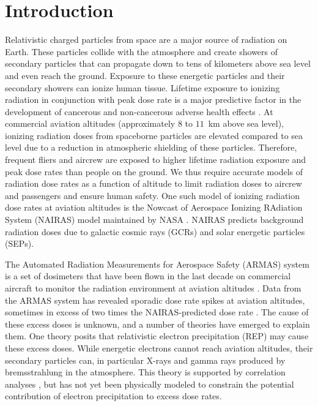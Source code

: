 \documentclass[draft]{agujournal2019}
\begin{document}
\section{Introduction}
Relativistic charged particles from space are a major source of radiation on Earth. These particles collide with the atmosphere and create showers of secondary particles that can propagate down to tens of kilometers above sea level and even reach the ground. Exposure to these energetic particles and their secondary showers can ionize human tissue. Lifetime exposure to ionizing radiation in conjunction with peak dose rate is a major predictive factor in the development of cancerous and non-cancerous adverse health effects \cite{lowe2022, shah2014}. At commercial aviation altitudes (approximately $8$ to $11$~km above sea level), ionizing radiation doses from spaceborne particles are elevated compared to sea level due to a reduction in atmospheric shielding of these particles. Therefore, frequent fliers and aircrew are exposed to higher lifetime radiation exposure and peak dose rates than people on the ground. We thus require accurate models of radiation dose rates as a function of altitude to limit radiation doses to aircrew and passengers and ensure human safety. One such model of ionizing radiation dose rates at aviation altitudes is the Nowcast of Aerospace Ionizing RAdiation System (NAIRAS) model maintained by NASA \cite{mertens2013}. NAIRAS predicts background radiation doses due to galactic cosmic rays (GCRs) and solar energetic particles (SEPs).

The Automated Radiation Measurements for Aerospace Safety (ARMAS) system is a set of dosimeters that have been flown in the last decade on commercial aircraft to monitor the radiation environment at aviation altitudes \cite{tobiska2016}. Data from the ARMAS system has revealed sporadic dose rate spikes at aviation altitudes, sometimes in excess of two times the NAIRAS-predicted dose rate \cite{tobiska2016, tobiska2018}. The cause of these excess doses is unknown, and a number of theories have emerged to explain them. One theory posits that relativistic electron precipitation (REP) may cause these excess doses. While energetic electrons cannot reach aviation altitudes, their secondary particles can, in particular X-rays and gamma rays produced by bremsstrahlung in the atmosphere. This theory is supported by correlation analyses \cite{aryan2023, aryan2025a, aryan2025b}, but has not yet been physically modeled to constrain the potential contribution of electron precipitation to excess dose rates.
\end{document}
